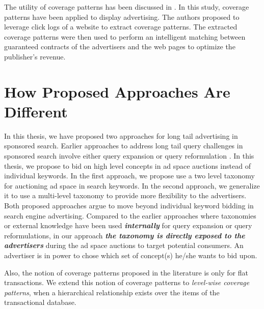 The utility of coverage patterns has been discussed in \cite{kavya2016coverage}. In this study, coverage patterns have been applied to display advertising. The authors proposed to leverage click logs of a website to extract coverage patterns. The extracted coverage patterns were then used to perform an intelligent matching between guaranteed contracts of the advertisers and the web pages to optimize the publisher's revenue.

\section{How Proposed Approaches Are Different}
In this thesis, we have proposed two approaches for long tail advertising in sponsored search. Earlier approaches to address long tail query challenges in sponsored search involve either query expansion \cite{broder2007robust, broder2008search, broder2009online,song2010optimal} or query reformulation \cite{szpektor2011improving,zhou2012collaborative, verma2014bringing, huang2016kb,sordoni2015hierarchical}. In this thesis, we propose to bid on high level concepts in ad space auctions instead of individual keywords. In the first approach, we propose use a two level taxonomy for auctioning ad space in search keywords. In the second approach, we generalize it to use a multi-level taxonomy to provide more flexibility to the advertisers. Both proposed approaches argue to move beyond individual keyword bidding in search engine advertising. Compared to the earlier approaches where taxonomies or external knowledge have been used \textbf{\textit{internally}} for query expansion or query reformulations, in our approach \textbf{\textit{the taxonomy is directly exposed to the advertisers}} during the ad space auctions to target potential consumers. An advertiser is in power to chose which set of concept(s) he/she wants to bid upon.


Also, the notion of coverage patterns proposed in the literature \cite{sripada2011coverage, srinivas2014mining} is only for flat transactions. We extend this notion of coverage patterns to \textit{level-wise coverage patterns}, when a hierarchical relationship exists over the items of the transactional database.


